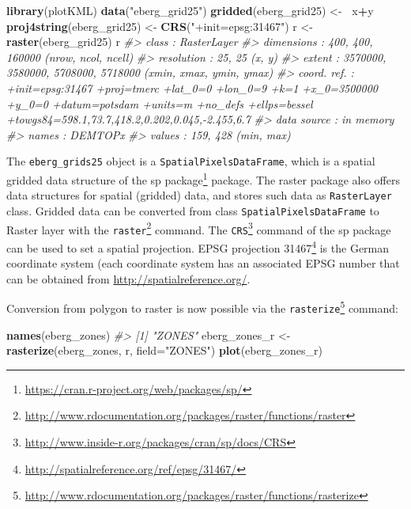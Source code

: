 \documentclass[11pt]{krantz}
\newenvironment{Shaded}{\begin{snugshade}}{\end{snugshade}}
\newcommand{\CommentTok}[1]{\textcolor[rgb]{0.37,0.37,0.37}{\textit{#1}}}
\newcommand{\DataTypeTok}[1]{\textcolor[rgb]{0.27,0.27,0.27}{#1}}
\newcommand{\ErrorTok}[1]{\textcolor[rgb]{0.14,0.14,0.14}{\textbf{#1}}}
\newcommand{\KeywordTok}[1]{\textcolor[rgb]{0.27,0.27,0.27}{\textbf{#1}}}
\newcommand{\NormalTok}[1]{#1}
\newcommand{\OperatorTok}[1]{\textcolor[rgb]{0.43,0.43,0.43}{\textbf{#1}}}
\newcommand{\StringTok}[1]{\textcolor[rgb]{0.5,0.5,0.5}{#1}}
\renewcommand{\href}[2]{#2\footnote{\url{#1}}}
\theoremstyle{definition}
\theoremstyle{definition}
\theoremstyle{definition}
\theoremstyle{remark}
\begin{document}
\begin{Shaded}
\begin{Highlighting}[]
\KeywordTok{library}\NormalTok{(plotKML)}
\KeywordTok{data}\NormalTok{(}\StringTok{"eberg_grid25"}\NormalTok{)}
\KeywordTok{gridded}\NormalTok{(eberg_grid25) <-}\StringTok{ }\ErrorTok{~}\NormalTok{x}\OperatorTok{+}\NormalTok{y}
\KeywordTok{proj4string}\NormalTok{(eberg_grid25) <-}\StringTok{ }\KeywordTok{CRS}\NormalTok{(}\StringTok{"+init=epsg:31467"}\NormalTok{)}
\NormalTok{r <-}\StringTok{ }\KeywordTok{raster}\NormalTok{(eberg_grid25)}
\NormalTok{r}
\CommentTok{#> class       : RasterLayer }
\CommentTok{#> dimensions  : 400, 400, 160000  (nrow, ncol, ncell)}
\CommentTok{#> resolution  : 25, 25  (x, y)}
\CommentTok{#> extent      : 3570000, 3580000, 5708000, 5718000  (xmin, xmax, ymin, ymax)}
\CommentTok{#> coord. ref. : +init=epsg:31467 +proj=tmerc +lat_0=0 +lon_0=9 +k=1 +x_0=3500000 +y_0=0 +datum=potsdam +units=m +no_defs +ellps=bessel +towgs84=598.1,73.7,418.2,0.202,0.045,-2.455,6.7 }
\CommentTok{#> data source : in memory}
\CommentTok{#> names       : DEMTOPx }
\CommentTok{#> values      : 159, 428  (min, max)}
\end{Highlighting}
\end{Shaded}

The \texttt{eberg\_grids25} object is a \texttt{SpatialPixelsDataFrame},
which is a spatial gridded data structure of the
\href{https://cran.r-project.org/web/packages/sp/}{sp package} package.
The raster package also offers data structures for spatial (gridded)
data, and stores such data as \texttt{RasterLayer} class. Gridded data
can be converted from class \texttt{SpatialPixelsDataFrame} to Raster
layer with the
\href{http://www.rdocumentation.org/packages/raster/functions/raster}{\texttt{raster}}
command. The
\href{http://www.inside-r.org/packages/cran/sp/docs/CRS}{\texttt{CRS}}
command of the sp package can be used to set a spatial projection.
\href{http://spatialreference.org/ref/epsg/31467/}{EPSG projection
31467} is the German coordinate system (each coordinate system has an
associated EPSG number that can be obtained from
\url{http://spatialreference.org/}.

Conversion from polygon to raster is now possible via the
\href{http://www.rdocumentation.org/packages/raster/functions/rasterize}{\texttt{rasterize}}
command:

\begin{Shaded}
\begin{Highlighting}[]
\KeywordTok{names}\NormalTok{(eberg_zones)}
\CommentTok{#> [1] "ZONES"}
\NormalTok{eberg_zones_r <-}\StringTok{ }\KeywordTok{rasterize}\NormalTok{(eberg_zones, r, }\DataTypeTok{field=}\StringTok{"ZONES"}\NormalTok{)}
\KeywordTok{plot}\NormalTok{(eberg_zones_r)}
\end{Highlighting}
\end{Shaded}
\end{document}

